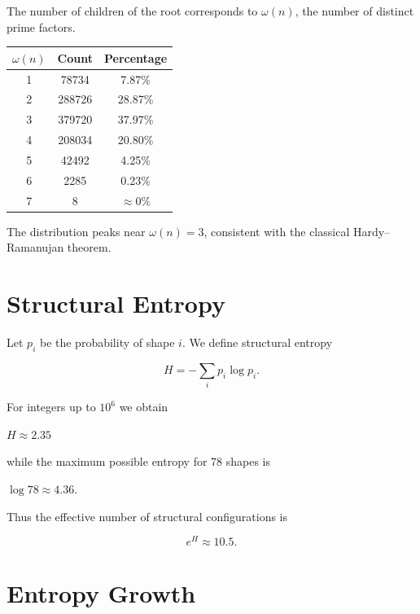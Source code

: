 \documentclass[11pt]{article}
\begin{document}
The number of children of the root corresponds to $\omega(n)$,
the number of distinct prime factors.

\begin{center}
\begin{tabular}{ccc}
\toprule
$\omega(n)$ & Count & Percentage \\
\midrule
1 & 78734 & 7.87\% \\
2 & 288726 & 28.87\% \\
3 & 379720 & 37.97\% \\
4 & 208034 & 20.80\% \\
5 & 42492 & 4.25\% \\
6 & 2285 & 0.23\% \\
7 & 8 & $\approx 0\%$ \\
\bottomrule
\end{tabular}
\end{center}

The distribution peaks near $\omega(n)=3$, consistent with
the classical Hardy--Ramanujan theorem.

\section{Structural Entropy}

Let $p_i$ be the probability of shape $i$.
We define structural entropy

\begin{equation}
H = -\sum_i p_i \log p_i.
\end{equation}

For integers up to $10^6$ we obtain

\begin{center}
$H \approx 2.35$
\end{center}

while the maximum possible entropy for 78 shapes is

\begin{center}
$\log 78 \approx 4.36$.
\end{center}

Thus the effective number of structural configurations is

\begin{equation}
e^H \approx 10.5.
\end{equation}

\section{Entropy Growth}
\end{document}
